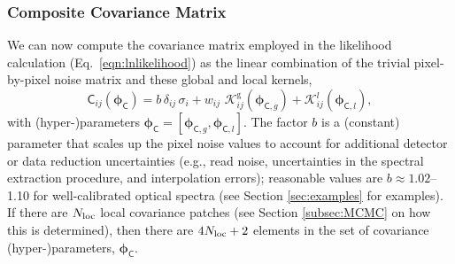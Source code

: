 \documentclass[iop,floatfix]{emulateapj}
\newcommand{\vC}{\mathsf{C}}
\newcommand{\vp}{ {\bm \phi}}
\newcommand{\cov}{ \vp_{\mathsf{C}}}
\newcommand{\KK}{\mathcal{K}}
\newcommand{\Kglobal}{\KK^{\textrm{g}}}
\newcommand{\Klocal}{\KK^l}
\begin{document}
\subsubsection{Composite Covariance Matrix}

We can now compute the covariance matrix employed in the likelihood calculation 
(Eq.~\ref{eqn:lnlikelihood}) as the linear combination of the trivial pixel-by-pixel noise matrix 
and these global and local kernels, 
\begin{equation}
\vC_{ij}(\cov)  = b \, \delta_{ij} \, \sigma_i + w_{ij} \,\, \Kglobal_{ij}(\vp_{{\mathsf C}, g}) + 
                  \Klocal_{ij}(\vp_{{\mathsf C}, l}), 
\end{equation}
with (hyper-)parameters $\cov = [\vp_{{\mathsf C}, g}, \vp_{{\mathsf C}, l}]$.  The factor $b$ is 
a (constant) parameter that scales up the pixel noise values to account for additional detector or 
data reduction uncertainties (e.g., read noise, uncertainties in the spectral extraction procedure, 
and interpolation errors); reasonable values are $b \approx 1.02$--1.10 for well-calibrated optical 
spectra (see Section \ref{sec:examples} for examples).  If there are $N_{\rm loc}$ local covariance 
patches (see Section \ref{subsec:MCMC} on how this is determined), then there are $4N_{\rm loc}+2$ 
elements in the set of covariance (hyper-)parameters, $\cov$.  

\end{document}
